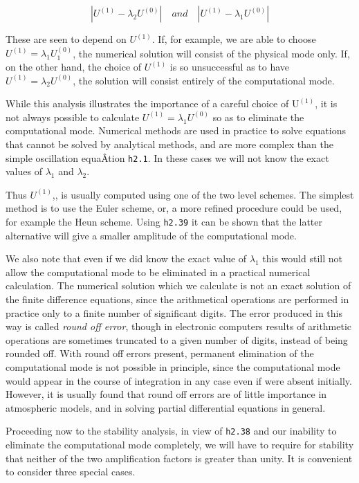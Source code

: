 \[|U^{(1)} - \lambda_2 U^{(0)}| \quad   and   \quad | U^{(1)} - \lambda_1 U^{(0)} |\]

These are seen to depend on \(U^{\left( 1 \right)}\). If, for example,
we are able to choose
\(U^{\left( 1 \right)} = \lambda_{1}U_{1}^{\left( 0 \right)}\), the
numerical solution will consist of the physical mode only. If, on the
other hand, the choice of \(U^{\left( 1 \right)}\) is so unsuccessful as
to have \(U^{\left( 1 \right)} = \lambda_{2}U^{\left( 0 \right)}\), the
solution will consist entirely of the computational mode.

While this analysis illustrates the importance of a careful choice of
\(\text{U}^{\left( 1 \right)}\), it is not always possible to calculate
\(U^{\left( 1 \right)} = \lambda_{1}U^{\left( 0 \right)}\) so as to
eliminate the computational mode. Numerical methods are used in practice
to solve equations that cannot be solved by analytical methods, and are
more complex than the simple oscillation equaÂ­tion \texttt{h2.1}. In
these cases we will not know the exact values of \(\lambda_{1}\) and
\(\lambda_{2}\).

Thus \(U^{\left( 1 \right)}\),, is usually computed using one of the two
level schemes. The simplest method is to use the Euler scheme, or, a
more refined procedure could be used, for example the Heun scheme. Using
\texttt{h2.39} it can be shown that the latter alternative will give a
smaller amplitude of the computational mode.

We also note that even if we did know the exact value of \(\lambda_{1}\)
this would still not allow the computational mode to be eliminated in a
practical numerical calculation. The numerical solution which we
calculate is not an exact solution of the finite difference equations,
since the arithmetical operations are performed in practice only to a
finite number of significant digits. The error produced in this way is
called \emph{round off error}, though in electronic computers results of
arithmetic operations are sometimes truncated to a given number of
digits, instead of being rounded off. With round off errors present,
permanent elimination of the computational mode is not possible in
principle, since the computational mode would appear in the course of
integration in any case even if were absent initially. However, it is
usually found that round off errors are of little importance in
atmospheric models, and in solving partial differential equations in
general.

Proceeding now to the stability analysis, in view of \texttt{h2.38} and
our inability to eliminate the computational mode completely, we will
have to require for stability that neither of the two amplification
factors is greater than unity. It is convenient to consider three
special cases.

